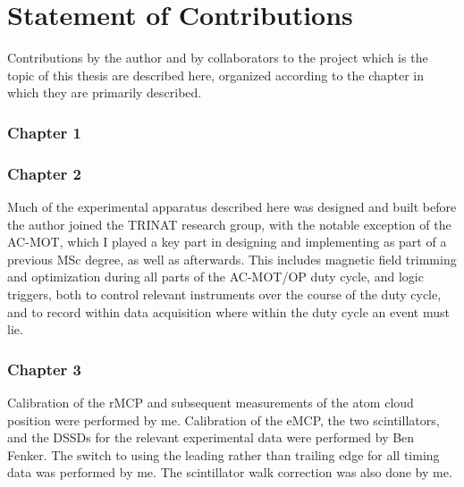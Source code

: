 

\clearpage
\chapter{Statement of Contributions}
\label{ch:contributions}

%
Contributions by the author and by collaborators to the project which is the topic of this thesis are described here, organized according to the chapter in which they are primarily described. 

\subsection*{Chapter 1}
\subsection*{Chapter 2}
Much of the experimental apparatus described here was designed and built before the author joined the TRINAT research group, with the notable exception of the AC-MOT, which I played a key part in designing and implementing as part of a previous MSc degree, as well as afterwards.  This includes magnetic field trimming and optimization during all parts of the AC-MOT/OP duty cycle, and logic triggers, both to control relevant instruments over the course of the duty cycle, and to record within data acquisition where within the duty cycle an event must lie.  
\subsection*{Chapter 3}
Calibration of the rMCP and subsequent measurements of the atom cloud position were performed by me.  Calibration of the eMCP, the two scintillators, and the DSSDs for the relevant experimental data were performed by Ben Fenker.  The switch to using the leading rather than trailing edge for all timing data was performed by me.  The scintillator walk correction was also done by me.  
